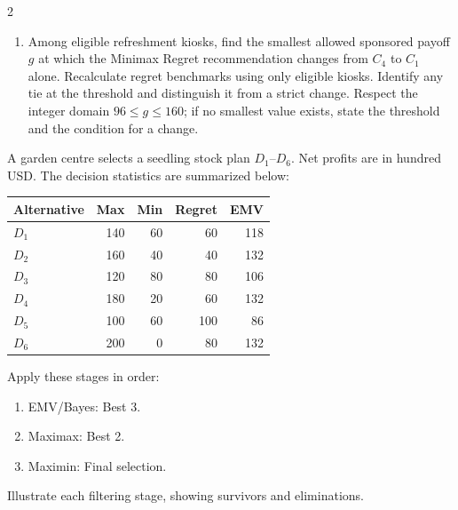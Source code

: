 \begin{multicols}{2}
\begin{enumerate}[label=\textbf{(\alph*)},leftmargin=*]
	\item Among eligible refreshment kiosks, find the smallest allowed sponsored payoff $g$ at which the Minimax Regret recommendation changes from $C_4$ to $C_1$ alone. Recalculate regret benchmarks using only eligible kiosks. Identify any tie at the threshold and distinguish it from a strict change. Respect the integer domain $96\leq g\leq160$; if no smallest value exists, state the threshold and the condition for a change. 
\end{enumerate}


\columnbreak
{}
A garden centre selects a seedling stock plan $D_1$--$D_6$. Net profits are in hundred USD. The decision statistics are summarized below:

\vspace{-3mm}
\begin{center}\small\setlength{\tabcolsep}{4pt}
	\begin{tabular}{lrrrr}\toprule
		Alternative & Max & Min & Regret & EMV\\ \midrule
		$D_1$ & 140 & 60 & 60 & 118\\
		$D_2$ & 160 & 40 & 40 & 132\\
		$D_3$ & 120 & 80 & 80 & 106\\
		$D_4$ & 180 & 20 & 60 & 132\\
		$D_5$ & 100 & 60 & 100 & 86\\
		$D_6$ & 200 & 0 & 80 & 132\\
		\bottomrule
	\end{tabular}
\end{center}
\vspace{-3mm}

Apply these stages in order:
\begin{enumerate}[leftmargin=*]
	\item EMV/Bayes: Best 3.
	\item Maximax: Best 2.
	\item Maximin: Final selection.
\end{enumerate}
Illustrate each filtering stage, showing survivors and eliminations.


\end{multicols}
\newpage
